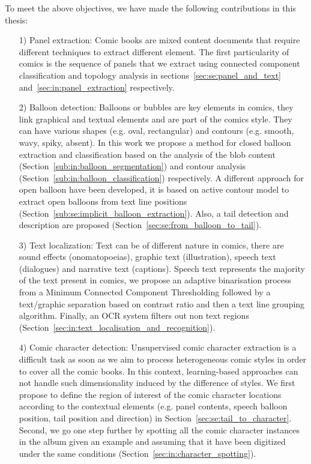 To meet the above objectives, we have made the following contributions in this thesis:

\begin{itemize}
	
	\item [1)] Panel extraction: Comic books are mixed content documents that require different techniques to extract different element.
	The first particularity of comics is the sequence of panels that we extract using connected component classification and topology analysis in sections~\ref{sec:se:panel_and_text} and~\ref{sec:in:panel_extraction} respectively.
	
	\item [2)] Balloon detection: Balloons or bubbles are key elements in comics,
	they link graphical and textual elements and are part of the comics style. They can have various shapes (e.g. oval, rectangular) and contours (e.g. smooth, wavy, spiky, absent).
	In this work we propose a method for closed balloon extraction and classification based on the analysis of the blob content (Section~\ref{sub:in:balloon_segmentation}) and contour analysis (Section~\ref{sub:in:balloon_classification}) respectively.
	A different approach for open balloon have been developed, it is based on active contour model to extract open balloons from text line positions (Section~\ref{sub:se:implicit_balloon_extraction}).
	Also, a tail detection and description are proposed (Section~\ref{sec:se:from_balloon_to_tail}).

	\item [3)] Text localization: Text can be of different nature in comics, there are sound effects (onomatopoeias), graphic text (illustration), speech text (dialogues) and narrative text (captions).
	Speech text represents the majority of the text present in comics, we propose an adaptive binarisation process from a Minimum Connected Component Thresholding followed by a text/graphic separation based on contrast ratio and then a text line grouping algorithm.
	Finally, an OCR system filters out non text regions (Section~\ref{sec:in:text_localisation_and_recognition}).

	
	\item [4)] Comic character detection: Unsupervised comic character extraction is a difficult task as soon as we aim to process heterogeneous comic styles in order to cover all the comic books.
	In this context, learning-based approaches can not handle such dimensionality induced by the difference of styles.
	We first propose to define the region of interest of the comic character locations according to the contextual elements (e.g. panel contents, speech balloon position, tail position and direction) in Section~\ref{sec:se:tail_to_character}.
	Second, we go one step further by spotting all the comic character instances in the album given an example and assuming that it have been digitized under the same conditions (Section~\ref{sec:in:character_spotting}).
	

\end{itemize}
